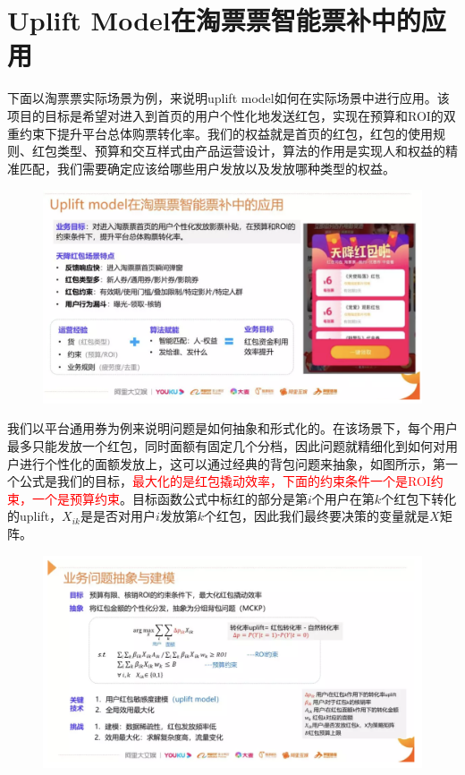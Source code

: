 \documentclass[12pt]{article}
\begin{document}
\section{Uplift Model在淘票票智能票补中的应用}
下面以淘票票实际场景为例，来说明uplift model如何在实际场景中进行应用。该项目的目标是希望对进入到首页的用户个性化地发送红包，实现在预算和ROI的双重约束下提升平台总体购票转化率。我们的权益就是首页的红包，红包的使用规则、红包类型、预算和交互样式由产品运营设计，算法的作用是实现人和权益的精准匹配，我们需要确定应该给哪些用户发放以及发放哪种类型的权益。
\begin{figure}[H]
    \centering
    \includegraphics[width=1\textwidth]{fig/CasualInference-Uplift-Model-In-Ali.png}
\end{figure}

我们以平台通用券为例来说明问题是如何抽象和形式化的。在该场景下，每个用户最多只能发放一个红包，同时面额有固定几个分档，因此问题就精细化到如何对用户进行个性化的面额发放上，这可以通过经典的背包问题来抽象，如图所示，第一个公式是我们的目标，\textcolor{red}{最大化的是红包撬动效率，下面的约束条件一个是ROI约束，一个是预算约束}。目标函数公式中标红的部分是第$i$个用户在第$k$个红包下转化的uplift，$X_{ik}$是是否对用户$i$发放第$k$个红包，因此我们最终要决策的变量就是$X$矩阵。
\begin{figure}[H]
    \centering
    \includegraphics[width=1\textwidth]{fig/CasualInference-Uplift-Model-In-Ali2.png}
\end{figure}
\end{document}
